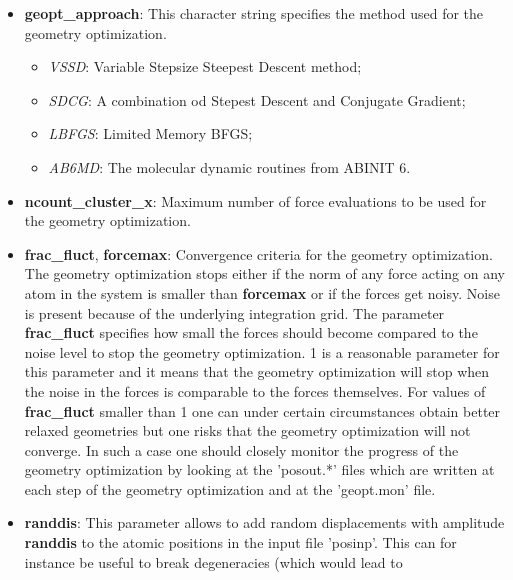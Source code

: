 \documentclass[a4paper,11pt]{report}
\begin{document}
\begin{itemize}
\item {\bf geopt\_approach}: This character string specifies the method used for the geometry optimization.
       \begin{itemize}
       \item  \emph{VSSD}: Variable Stepsize Steepest Descent method;
       \item  \emph{SDCG}: A combination od Stepest Descent and Conjugate Gradient;
       \item  \emph{LBFGS}: Limited Memory BFGS;
       \item  \emph{AB6MD}: The molecular dynamic routines from ABINIT 6.
       \end{itemize}
\item {\bf  ncount\_cluster\_x}: Maximum number of force evaluations to be used for the geometry optimization.
\item {\bf frac\_fluct}, {\bf forcemax}: Convergence criteria for the geometry optimization. The geometry optimization stops either 
                                           if the norm of any force acting on any atom in the system is smaller than {\bf forcemax} 
                                           or if the forces get noisy. Noise is present because of the underlying integration grid.
                                           The parameter {\bf frac\_fluct} specifies how small the forces should become 
                                           compared to the noise level to stop the geometry optimization. 1 is a reasonable parameter 
                                           for this parameter and it means that the geometry optimization will stop when the noise 
                                           in the forces is comparable to the forces themselves. For values of  {\bf frac\_fluct} 
                                           smaller than 1 one can under certain circumstances obtain better relaxed geometries but 
                                           one risks that the geometry optimization will not converge. In such a case one should 
                                           closely monitor the progress of the geometry optimization by looking at the 'posout.*' 
                                           files which are written at each step of the geometry optimization and at the 'geopt.mon' file. 
\item  {\bf randdis}: This parameter allows to add random displacements with amplitude \textbf{randdis} to the atomic positions in the 
                        input file 'posinp'. This can for instance be useful to break degeneracies (which would lead to 

\end{itemize}
\end{document}
